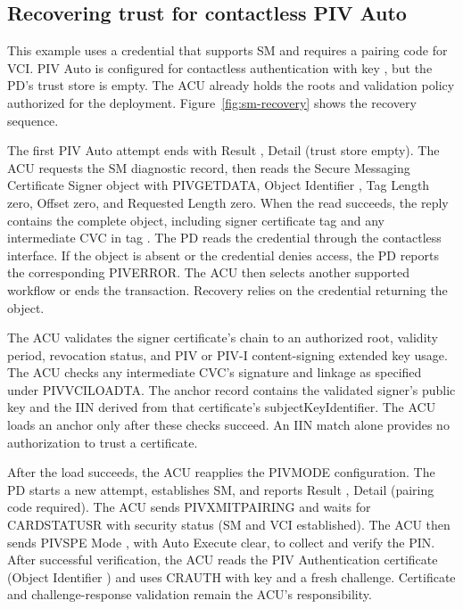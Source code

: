\subsection{Recovering trust for contactless PIV Auto}
\label{ex:sm-recovery}

This example uses a credential that supports SM and requires a pairing code
for VCI. PIV Auto is configured for contactless authentication with key
, but the PD's trust store is empty. The ACU already holds the roots
and validation policy authorized for the deployment. Figure~\ref{fig:sm-recovery}
shows the recovery sequence.



The first PIV Auto attempt ends with Result , Detail 
(trust store empty). The ACU requests the SM diagnostic record, then reads the
Secure Messaging Certificate Signer object with PIVGETDATA, Object Identifier
, Tag Length zero, Offset zero, and Requested Length zero.
When the read succeeds, the reply contains the complete object, including
signer certificate tag  and any intermediate CVC in tag .
The PD reads the credential through the contactless interface. If the object
is absent or the credential denies access, the PD reports the corresponding
PIVERROR. The ACU then selects another supported workflow or ends the
transaction. Recovery relies on the credential returning the object.

The ACU validates the signer certificate's chain to an authorized root,
validity period, revocation status, and PIV or PIV-I content-signing extended
key usage. The ACU checks any intermediate CVC's signature and linkage as
specified under PIVVCILOADTA. The anchor record contains the validated signer's
public key and the IIN derived from that certificate's subjectKeyIdentifier.
The ACU loads an anchor only after these checks succeed.
An IIN match alone provides no authorization to trust a certificate.

After the load succeeds, the ACU reapplies the PIVMODE configuration. The PD
starts a new attempt, establishes SM, and reports Result , Detail
 (pairing code required). The ACU sends PIVXMITPAIRING and waits for
CARDSTATUSR with security status  (SM and VCI established).
The ACU then sends PIVSPE Mode , with Auto Execute clear, to collect
and verify the PIN. After successful verification, the ACU reads the PIV
Authentication certificate (Object Identifier ) and uses CRAUTH
with key  and a fresh challenge. Certificate and challenge-response
validation remain the ACU's responsibility.

